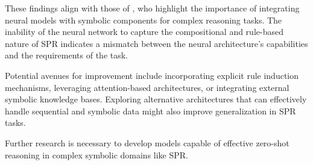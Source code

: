 \documentclass{article} %
\begin{document}
These findings align with those of \citet{hu2023codepa}, who highlight the importance of integrating neural models with symbolic components for complex reasoning tasks. The inability of the neural network to capture the compositional and rule-based nature of SPR indicates a mismatch between the neural architecture's capabilities and the requirements of the task.

Potential avenues for improvement include incorporating explicit rule induction mechanisms, leveraging attention-based architectures, or integrating external symbolic knowledge bases. Exploring alternative architectures that can effectively handle sequential and symbolic data might also improve generalization in SPR tasks.

Further research is necessary to develop models capable of effective zero-shot reasoning in complex symbolic domains like SPR.
\end{document}

